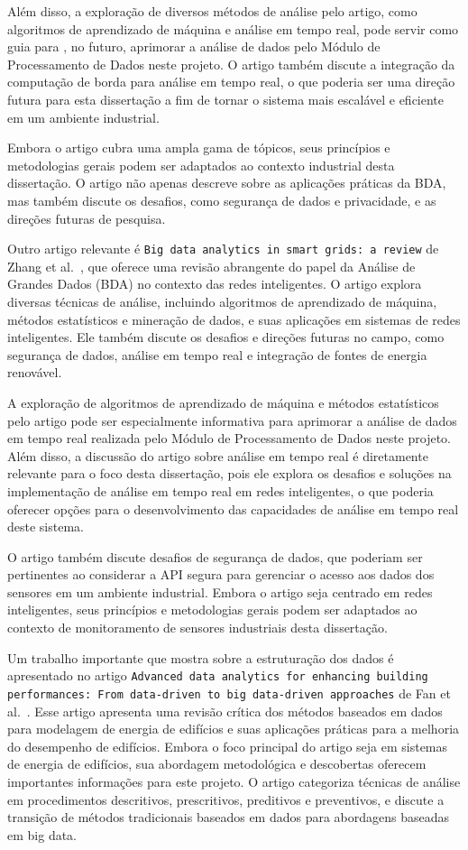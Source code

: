 Além disso, a exploração de diversos métodos de análise pelo artigo, como algoritmos de aprendizado de máquina e análise em tempo real, pode servir como guia para , no futuro, aprimorar a análise de dados pelo Módulo de Processamento de Dados neste projeto. O artigo também discute a integração da computação de borda para análise em tempo real, o que poderia ser uma direção futura para esta dissertação a fim de tornar o sistema mais escalável e eficiente em um ambiente industrial.

Embora o artigo cubra uma ampla gama de tópicos, seus princípios e metodologias gerais podem ser adaptados ao contexto industrial desta dissertação. O artigo não apenas descreve sobre as aplicações práticas da BDA, mas também discute os desafios, como segurança de dados e privacidade, e as direções futuras de pesquisa.


Outro artigo relevante é \texttt{Big data analytics in smart grids: a review} de Zhang et al.~\cite{Zhang2018}, que oferece uma revisão abrangente do papel da Análise de Grandes Dados (BDA) no contexto das redes inteligentes. O artigo explora diversas técnicas de análise, incluindo algoritmos de aprendizado de máquina, métodos estatísticos e mineração de dados, e suas aplicações em sistemas de redes inteligentes. Ele também discute os desafios e direções futuras no campo, como segurança de dados, análise em tempo real e integração de fontes de energia renovável.

A exploração de algoritmos de aprendizado de máquina e métodos estatísticos pelo artigo pode ser especialmente informativa para aprimorar a análise de dados em tempo real realizada pelo Módulo de Processamento de Dados neste projeto. Além disso, a discussão do artigo sobre análise em tempo real é diretamente relevante para o foco desta dissertação, pois ele explora os desafios e soluções na implementação de análise em tempo real em redes inteligentes, o que poderia oferecer opções para o desenvolvimento das capacidades de análise em tempo real deste sistema.

O artigo também discute desafios de segurança de dados, que poderiam ser pertinentes ao considerar a API segura para gerenciar o acesso aos dados dos sensores em um ambiente industrial. Embora o artigo seja centrado em redes inteligentes, seus princípios e metodologias gerais podem ser adaptados ao contexto de monitoramento de sensores industriais desta dissertação.


Um trabalho importante que mostra sobre a estruturação dos dados é apresentado no artigo \texttt{Advanced data analytics for enhancing building performances: From data-driven to big data-driven approaches} de Fan et al.~\cite{Fan2021}. Esse artigo apresenta uma revisão crítica dos métodos baseados em dados para modelagem de energia de edifícios e suas aplicações práticas para a melhoria do desempenho de edifícios. Embora o foco principal do artigo seja em sistemas de energia de edifícios, sua abordagem metodológica e descobertas oferecem importantes informações para este projeto. O artigo categoriza técnicas de análise em procedimentos descritivos, prescritivos, preditivos e preventivos, e discute a transição de métodos tradicionais baseados em dados para abordagens baseadas em big data.

